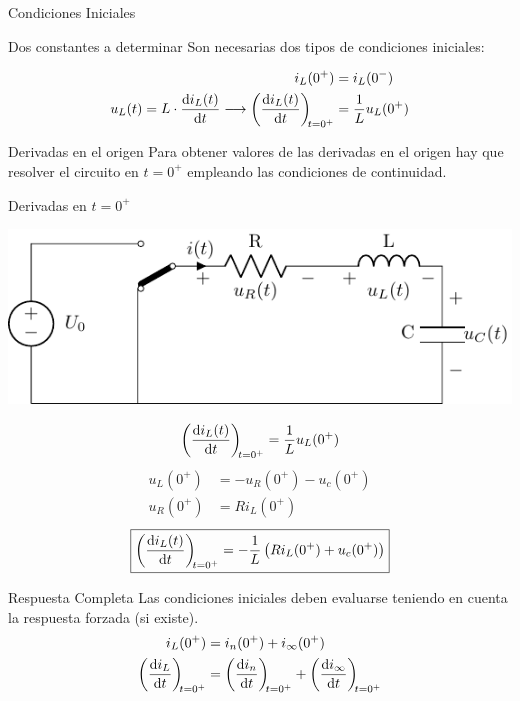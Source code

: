 \documentclass[aspectratio=169, usenames,svgnames,dvipsnames]{beamer}
\begin{document}
\begin{frame}[label={sec:orgd5a00e7}]{Condiciones Iniciales}
\begin{block}{Dos constantes a determinar}
Son necesarias dos tipos de condiciones iniciales:

\begin{align*}
  i_L(0^+) &= i_L(0^-)\\
  u_L(t) = L \cdot \diff{i_L(t)}{t} \longrightarrow   \diff{i_L(t)}{t}[t = 0^+] &= \frac{1}{L} u_L(0^+)
\end{align*}
\end{block}

\begin{block}{Derivadas en el origen}
Para obtener valores de las derivadas en el origen hay que resolver el circuito en \(t = 0^+\) empleando las condiciones de continuidad.
\end{block}
\end{frame}

\begin{frame}[label={sec:org24c9c41}]{Derivadas en \(t = 0^+\)}
\begin{center}
\includegraphics[height=0.35\textheight]{../figs/transitorio_circuitoRLC_serie_t0+.pdf}
\end{center}

\[
  \diff{i_L(t)}{t}[t = 0^+] = \frac{1}{L} u_L(0^+)
\]
\begin{align*}
  u_L(0^+) &= -u_R(0^+) - u_c(0^+)\\
  u_R(0^+) &= R i_L(0^+)
\end{align*}
\[
\boxed{\diff{i_L(t)}{t}[t = 0^+] = - \frac{1}{L}\left(R i_L(0^+) + u_c(0^+)\right)}
\]
\end{frame}

\begin{frame}[label={sec:org42f2890}]{Respuesta Completa}
Las condiciones iniciales deben evaluarse teniendo en cuenta la respuesta forzada (si existe).
\begin{align*}
  i_L(0^+) &= i_n(0^+) + i_{\infty}(0^+)\\
  \diff{i_L}{t}[t = 0^+] &= \diff{i_n}{t}[t = 0^+] + \diff{i_{\infty}}{t}[t = 0^+]  
\end{align*}
\end{frame}
\end{document}
